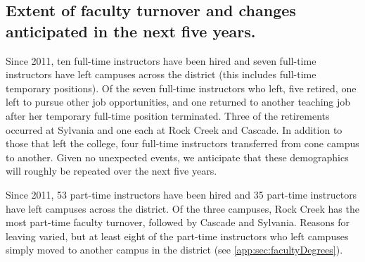 

\subsection[Faculty turnover]{Extent of faculty turnover and changes anticipated in the next five
years.}
Since 2011, ten full-time instructors have been hired and seven full-time
instructors have left campuses across the district (this includes full-time
temporary positions).  Of the seven full-time
instructors who left, five retired, one left to pursue other job opportunities,
and one returned to another teaching job after her temporary full-time position
terminated.  Three of the retirements occurred at Sylvania and one each at Rock
Creek and Cascade.  In addition to those that left the college, four full-time
instructors transferred from cone campus to another.   Given no unexpected
events, we anticipate that these demographics will roughly be repeated over the
next five years.


Since 2011, 53 part-time instructors have been hired and 35 part-time
instructors have left campuses across the district.  Of the three campuses,
Rock Creek has the most part-time faculty turnover, followed by Cascade and
Sylvania.  Reasons for leaving varied, but at least eight of the part-time
instructors who left campuses simply moved to another campus in the district
(see \vref{app:sec:facultyDegrees}).

